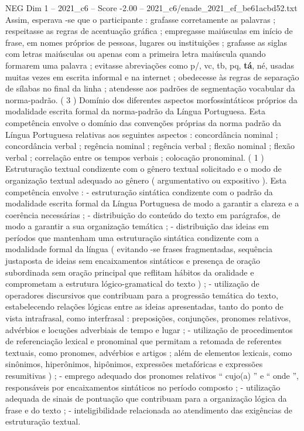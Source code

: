 \begin{textsample}{NEG Dim 1 – 2021\_c6 – Score -2.00 – 2021\_c6/enade\_2021\_ef\_be61acbd52.txt}
Assim, esperava -se que o participante : grafasse corretamente as palavras ; respeitasse as regras de acentuação gráfica ; empregasse maiúsculas em início de frase, em nomes próprios de pessoas, lugares ou instituições ; grafasse as siglas com letras maiúsculas ou apenas com a primeira letra maiúscula quando formarem uma palavra ; evitasse abreviações como p/, vc, tb, pq, \textbf{tá}, né, usadas muitas vezes em escrita informal e na internet ; obedecesse às regras de separação de sílabas no final da linha ; atendesse aos padrões de segmentação vocabular da norma-padrão. ( 3 ) Domínio dos diferentes aspectos morfossintáticos próprios da modalidade escrita formal da norma-padrão da Língua Portuguesa.
Esta competência envolve o domínio das convenções próprias da norma padrão da Língua Portuguesa relativas aos seguintes aspectos : concordância nominal ; concordância verbal ; regência nominal ; regência verbal ; flexão nominal ; flexão verbal ; correlação entre os tempos verbais ; colocação pronominal. ( 1 ) Estruturação textual condizente com o gênero textual solicitado e o modo de organização textual adequado ao gênero ( argumentativo ou expositivo ).
Esta competência envolve : - estruturação sintática condizente com o padrão da modalidade escrita formal da Língua Portuguesa de modo a garantir a clareza e a coerência necessárias ; - distribuição do conteúdo do texto em parágrafos, de modo a garantir a sua organização temática ; - distribuição das ideias em períodos que mantenham uma estruturação sintática condizente com a modalidade formal da língua ( evitando -se frases fragmentadas, sequência justaposta de ideias sem encaixamentos sintáticos e presença de oração subordinada sem oração principal que reflitam hábitos da oralidade e comprometam a estrutura lógico-gramatical do texto ) ; - utilização de operadores discursivos que contribuam para a progressão temática do texto, estabelecendo relações lógicas entre as ideias apresentadas, tanto do ponto de vista intrafrasal, como interfrasal : preposições, conjunções, pronomes relativos, advérbios e locuções adverbiais de tempo e lugar ; - utilização de procedimentos de referenciação lexical e pronominal que permitam a retomada de referentes textuais, como pronomes, advérbios e artigos ; além de elementos lexicais, como sinônimos, hiperônimos, hipônimos, expressões metafóricas e expressões resumitivas ) ; - emprego adequado dos pronomes relativos “ cujo(a) ” e “ onde ”, responsáveis por encaixamentos sintáticos no período composto ; - utilização adequada de sinais de pontuação que contribuam para a organização lógica da frase e do texto ; - inteligibilidade relacionada ao atendimento das exigências de estruturação textual.

\end{textsample}
